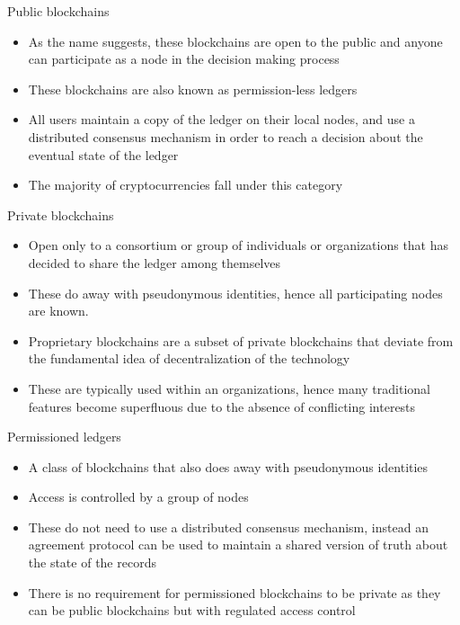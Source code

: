 \documentclass[11pt]{beamer}
\begin{document}
\begin{frame}{Public blockchains}
	\begin{itemize}
		\item As the name suggests, these blockchains are open to the public and anyone can participate as a node in the decision making process
		\item These blockchains are also known as permission-less ledgers
		\item All users maintain a copy of the ledger on their local nodes, and use a distributed consensus mechanism in order to reach a decision about the eventual state of the ledger
		\item The majority of cryptocurrencies fall under this category
	\end{itemize}
\end{frame}


\begin{frame}{Private blockchains}
	\begin{itemize}
		\item Open only to a consortium or group of individuals or organizations that has decided to share the ledger among themselves
		\item These do away with pseudonymous identities, hence all participating nodes are known.
		\item Proprietary blockchains are a subset of private blockchains that deviate from the fundamental idea of decentralization of the technology
		\item These are typically used within an organizations, hence many traditional features become superfluous due to the absence of conflicting interests
	\end{itemize}
\end{frame}


\begin{frame}{Permissioned ledgers}
	\begin{itemize}
		\item A class of blockchains that also does away with pseudonymous identities
		\item Access is controlled by a group of nodes
		\item These do not need to use a distributed consensus mechanism, instead an agreement protocol can be used to maintain a shared version of truth about the state of the records
		\item There is no requirement for permissioned blockchains to be private as they can be public blockchains but with regulated access control
	\end{itemize}
\end{frame}
\end{document}
